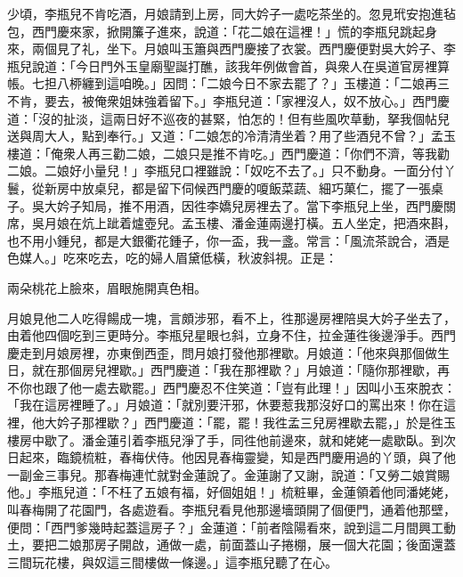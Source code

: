 少頃，李瓶兒不肯吃酒，月娘請到上房，同大妗子一處吃茶坐的。忽見玳安抱進毡包，西門慶來家，掀開簾子進來，說道：「花二娘在這裡！」慌的李瓶兒跳起身來，兩個見了礼，坐下。月娘叫玉簫與西門慶接了衣裳。西門慶便對吳大妗子、李瓶兒說道：「今日門外玉皇廟聖誕打醮，該我年例做會首，與衆人在吳道官房裡算帳。七担八桺纏到這咱晚。」因問：「二娘今日不家去罷了？」玉樓道：「二娘再三不肯，要去，被俺衆姐妹強着留下。」李瓶兒道：「家裡沒人，奴不放心。」西門慶道：「沒的扯淡，這兩日好不巡夜的甚緊，怕怎的！但有些風吹草動，拏我個帖兒送與周大人，點到奉行。」又道：「二娘怎的冷清清坐着？{}{}用了些酒兒不曾？」孟玉樓道：「俺衆人再三勸二娘，二娘只是推不肯吃。」西門慶道：「你們不濟，等我勸二娘。二娘好小量兒！」{}李瓶兒口裡雖說：「奴吃不去了。」只不動身。一面分付丫鬟，從新房中放桌兒，都是留下伺候西門慶的嗄飯菜蔬、細巧菓仁，擺了一張桌子。吳大妗子知局，推不用酒，因徃李嬌兒房裡去了。{}當下李瓶兒上坐，西門慶關席，吳月娘在炕上跐着爐壺兒。{}孟玉樓、潘金蓮兩邊打橫。五人坐定，把酒來斟，也不用小鍾兒，都是大銀衢花鍾子，你一盃，我一盞。常言：「風流茶說合，酒是色媒人。」吃來吃去，吃的婦人眉黛低橫，秋波斜視。{}正是：

兩朵桃花上臉來，眉眼施開真色相。

月娘見他二人吃得餳成一塊，言頗涉邪，看不上，{}徃那邊房裡陪吳大妗子坐去了，由着他四個吃到三更時分。李瓶兒星眼乜斜，立身不住，拉金蓮徃後邊淨手。西門慶走到月娘房裡，亦東倒西歪，問月娘打發他那裡歇。月娘道：「他來與那個做生日，就在那個房兒裡歇。」西門慶道：「我在那裡歇？」{}月娘道：「隨你那裡歇，再不你也跟了他一處去歇罷。」西門慶忍不住笑道：「豈有此理！」因叫小玉來脫衣：「我在這房裡睡了。」{}月娘道：「就別要汗邪，休要惹我那沒好口的罵出來！你在這裡，他大妗子那裡歇？」西門慶道：「罷，罷！{}我徃孟三兒房裡歇去罷，」於是徃玉樓房中歇了。潘金蓮引着李瓶兒淨了手，同徃他前邊來，就和姥姥一處歇臥。到次日起來，臨鏡梳粧，春梅伏侍。他因見春梅靈變，知是西門慶用過的丫頭，與了他一副金三事兒。{}那春梅連忙就對金蓮說了。金蓮謝了又謝，說道：「又勞二娘賞賜他。」李瓶兒道：「不枉了五娘有福，好個姐姐！」梳粧畢，金蓮領着他同潘姥姥，叫春梅開了花園門，各處遊看。李瓶兒看見他那邊墻頭開了個便門，通着他那壁，便問：「西門爹幾時起蓋這房子？」金蓮道：「前者陰陽看來，說到這二月間興工動土，要把二娘那房子開啟，通做一處，前面蓋山子捲棚，展一個大花園；後面還蓋三間玩花樓，與奴這三間樓做一條邊。」這李瓶兒聽了在心。

